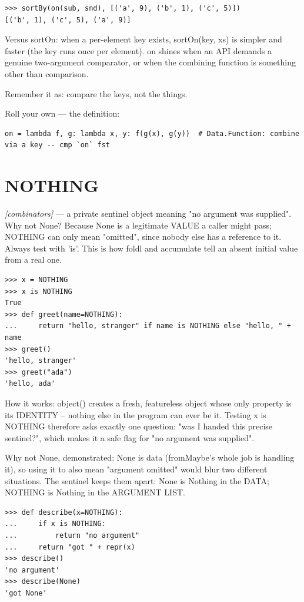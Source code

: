 \documentclass[11pt,letterpaper]{book}
\begin{document}
\begin{lstlisting}[style=spec]
>>> sortBy(on(sub, snd), [('a', 9), ('b', 1), ('c', 5)])
[('b', 1), ('c', 5), ('a', 9)]
\end{lstlisting}

Versus sortOn: when a per-element key exists, sortOn(key, xs) is simpler and faster (the key runs once per element). on shines when an API demands a genuine two-argument comparator, or when the combining function is something other than comparison.


Remember it as: compare the keys, not the things.


Roll your own --- the definition:

\begin{lstlisting}[style=code]
on = lambda f, g: lambda x, y: f(g(x), g(y))  # Data.Function: combine via a key -- cmp `on` fst
\end{lstlisting}

\section{NOTHING}
\noindent\textit{[combinators]} --- a private sentinel object meaning "no argument was supplied". Why not None? Because None is a legitimate VALUE a caller might pass; NOTHING can only mean "omitted", since nobody else has a reference to it. Always test with 'is'. This is how foldl and accumulate tell an absent initial value from a real one.
\begin{lstlisting}[style=spec]
>>> x = NOTHING
>>> x is NOTHING
True
>>> def greet(name=NOTHING):
...     return "hello, stranger" if name is NOTHING else "hello, " + name
>>> greet()
'hello, stranger'
>>> greet("ada")
'hello, ada'
\end{lstlisting}

How it works: object() creates a fresh, featureless object whose only property is its IDENTITY -- nothing else in the program can ever be it. Testing x is NOTHING therefore asks exactly one question: "was I handed this precise sentinel?", which makes it a safe flag for "no argument was supplied".


Why not None, demonstrated: None is data (fromMaybe's whole job is handling it), so using it to also mean "argument omitted" would blur two different situations. The sentinel keeps them apart: None is Nothing in the DATA; NOTHING is Nothing in the ARGUMENT LIST.

\begin{lstlisting}[style=spec]
>>> def describe(x=NOTHING):
...     if x is NOTHING:
...         return "no argument"
...     return "got " + repr(x)
>>> describe()
'no argument'
>>> describe(None)
'got None'
\end{lstlisting}
\end{document}

